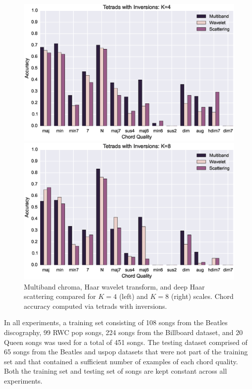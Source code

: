 \documentclass{article}
\begin{document}
\begin{figure}[h!]
\centering
\begin{minipage}{\columnwidth}
	\centering
	\includegraphics[width=1.05\columnwidth]{figs/tetrad_inv4.eps}
\end{minipage}
\begin{minipage}{\columnwidth}
	\centering
	\includegraphics[width=1.05\columnwidth]{figs/tetrad_inv8.eps}
\end{minipage}
\caption{Multiband chroma, Haar wavelet transform, and deep Haar scattering compared for $K=4$ (left) and $K=8$ (right) scales. Chord accuracy computed via tetrads with inversions.}
\label{fig:tetrads}
\end{figure}

In all experiments, a training set consisting of 108 songs from the Beatles
discography, 99 RWC pop songs, 224 songs from the Billboard dataset, and 20 Queen songs was used for a total of 451 songs.
The testing dataset comprised of 65 songs from the Beatles and uspop datasets that were not part
of the training set and that contained a sufficient number of examples of each chord quality. 
Both the training set and testing set of songs are kept constant across all experiments.
	
\end{document}
